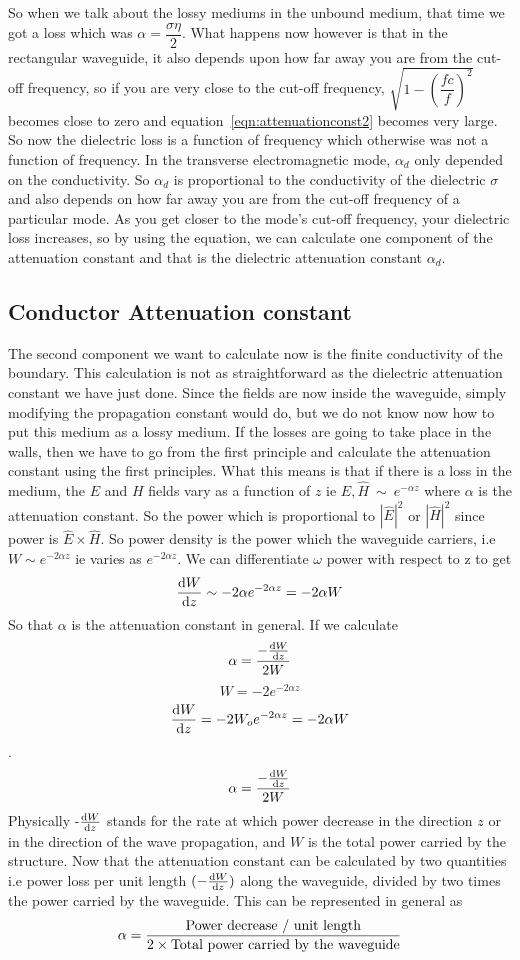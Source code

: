 So when we talk about the lossy mediums in the unbound medium, that time we got a loss which was $\alpha = \dfrac{\sigma\eta}{2}$. What happens now however is that in the rectangular waveguide, it also depends upon how far away you are from the cut-off frequency, so if you are very close to the cut-off frequency, $\sqrt{1 - \left(\dfrac{fc}{f}\right)^{2}}$ becomes close to zero and equation~\ref{eqn:attenuationconst2} becomes very large. So now the dielectric loss is a function of frequency which otherwise was not a function of frequency. In the transverse electromagnetic mode,  $\alpha_{d}$ only depended on the conductivity. So $\alpha_{d}$ is proportional to the conductivity of the dielectric $\sigma$ and also depends on how far away you are from the cut-off frequency of a particular mode. As you get closer to the mode's cut-off frequency, your dielectric loss increases, so by using the equation, we can calculate one component of the attenuation constant and that is the dielectric attenuation constant $\alpha_{d}$.

\subsection{Conductor Attenuation constant}
The second component we want to calculate now is the finite conductivity of the boundary. This calculation is not as straightforward as the dielectric attenuation constant we have just done. Since the fields are now inside the waveguide, simply modifying the propagation constant would do, but we do not know now how to put this medium as a lossy medium. If the losses are going to take place in the walls, then we have to go from the first principle and calculate the attenuation constant using the first principles. What this means is that if there is a loss in the medium, the $E$ and $H$ fields vary as a function of $z$ ie $ {\hat{E}}, {\hat{H}} \ \sim\ e^{-\alpha z}$ where $\alpha$ is the attenuation constant. So the power which is proportional to $|{\hat{E}}|^{2}$ or $|{\hat{H}}|^{2}$ since power is ${\hat{E}}\times{\hat{H}}$. So power density is the power which the waveguide carriers, i.e $W\sim e^{-2\alpha z}$ ie varies as $e^{-2\alpha z}$. We can differentiate $\omega$ power with respect to z to get 
$$\dv{W}{z}\sim-2\alpha e^{-2\alpha z} = -2\alpha W$$ 
So that $\alpha$ is the attenuation constant in general. If we calculate 
$$\alpha = \dfrac{-\dv{W}{z}}{2W}$$
$$W = -2e^{-2\alpha z}$$ 
$$\dv{W}{z} = -2W_o e^{-2\alpha z} = -2\alpha W$$. 
$$\alpha = \dfrac{-\dv{W}{z}}{2W}$$ 
Physically -$\dv{W}{z}$ stands for the rate at which power decrease in the direction $z$ or in the direction of the wave propagation, and $W$ is the total power carried by the structure. Now that the attenuation constant can be calculated by two quantities i.e power loss per unit length $(-\dv{W}{z})$  along the waveguide, divided by two times the power carried by the waveguide. This can be represented in general as
\begin{dmath}
\alpha = \dfrac{\textnormal{Power decrease / unit length}}{2\times \textnormal{Total power carried by the waveguide}}
\end{dmath}

